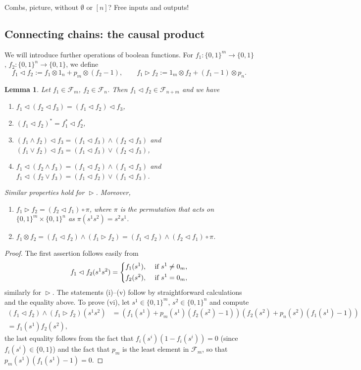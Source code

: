 \documentclass[12pt]{article}
\newtheorem{lemma}{Lemma}
\theoremstyle{definition}
\theoremstyle{remark}
\def\Fe{\mathcal F}
\def\vtl{\vartriangleleft}
\def\vtr{\vartriangleright}
\begin{document}
Combs, picture, without $\emptyset$ or $[n]$? Free inputs and outputs!


\subsection{Connecting chains: the causal product}




We will introduce further operations of boolean functions. For
$f_1:\{0,1\}^m\to \{0,1\}$,
$f_2:\{0,1\}^n\to \{0,1\}$, we define 
\[
f_1\vartriangleleft f_2:=f_1\otimes 1_n+p_m\otimes (f_2-1),\qquad  f_1\vartriangleright
f_2:=1_m\otimes f_2+(f_1-1)\otimes p_n.
\]

\begin{lemma}\label{lemma:causal_product}
Let $f_1\in \Fe_m$, $f_2\in \Fe_n$. Then $f_1\vartriangleleft f_2\in \Fe_{n+m}$ and we
have
\begin{enumerate}
\item[(i)] $f_1\vtl (f_2 \vtl f_3)=(f_1\vtl f_2)\vtl f_3$,
\item[(ii)] $(f_1\vtl f_2)^*=f_1^*\vtl f_2^*$,
\item[(iii)] $(f_1\wedge f_2)\vtl f_3=(f_1\vtl f_3)\wedge ( f_2\vtl f_3)$ and  $(f_1\vee
f_2)\vtl f_3=(f_1\vtl f_3)\vee ( f_2\vtl f_3)$,
\item[(iv)] $f_1\vtl (f_2\wedge f_3)=(f_1\vtl f_2)\wedge ( f_1\vtl f_3)$ and  $f_1\vtl
(f_2\vee
f_3)=(f_1\vtl f_2)\vee ( f_1\vtl f_3)$.

\end{enumerate}
Similar properties hold for $\vtr$. Moreover,
\begin{enumerate}
\item[(v)] $f_1\vtr f_2=(f_2\vtl f_1)\circ \pi$, where $\pi$ is the permutation that
acts on $\{0,1\}^{m}\times \{0,1\}^n$ as $\pi(s^1s^2)=s^2s^1$.
\item[(vi)] $f_1\otimes f_2=(f_1\vtl f_2)\wedge (f_1\vtr f_2)=(f_1\vtl f_2)\wedge (f_2\vtl
f_1)\circ \pi$.
\end{enumerate}


\end{lemma}

\begin{proof} The first assertion follows easily from
\[
f_1\vtl f_2(s^1s^2)=\begin{dcases} f_1(s^1), & \text{ if } s^1\ne 0_m,\\
   f_2(s^2), & \text{ if } s^1=0_m,
   \end{dcases}
\]
similarly for $\vtr$. 
The statements (i)--(v) follow by straightforward calculations and the equality above.  To prove (vi), let
$s^1\in \{0,1\}^m$, $s^2\in \{0,1\}^n$ and compute
\begin{align*}
(f_1\vtl f_2)\wedge (f_1\vtr
f_2)(s^1s^2)&=\left(f_1(s^1)+p_{m}(s^1)(f_2(s^2)-1)\right)\left(f_2(s^2)+p_{n}(s^2)(f_1(s^1)-1)\right)\\
=f_1(s^1)f_2(s^2),
\end{align*}
the last equality follows from the fact that $f_i(s^i)(1-f_i(s^i))=0$ (since $f_i(s^i)\in
\{0,1\}$) and the fact that $p_m$ is the least element in $\Fe_m$, so that
$p_m(s^1)(f_1(s^1)-1)=0$. 

\end{proof}
\end{document}
